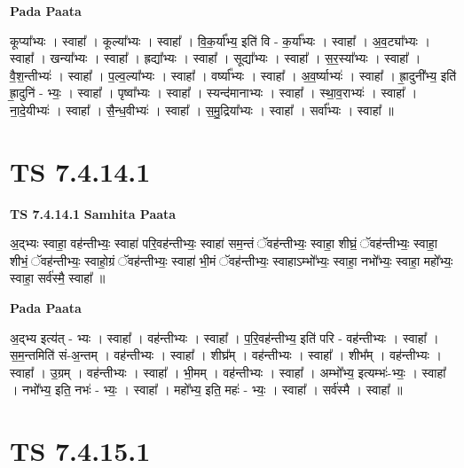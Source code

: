 \documentclass[17pt]{extarticle}
\begin{document}
\textbf{Pada Paata} \newline

कूप्या᳚भ्यः । स्वाहा᳚ । कूल्या᳚भ्यः । स्वाहा᳚ । वि॒क॒र्या᳚भ्य॒ इति॑ वि - क॒र्या᳚भ्यः । स्वाहा᳚ । अ॒व॒ट्या᳚भ्यः । स्वाहा᳚ । खन्या᳚भ्यः । स्वाहा᳚ । ह्रद्या᳚भ्यः । स्वाहा᳚ । सूद्या᳚भ्यः । स्वाहा᳚ । स॒र॒स्या᳚भ्यः । स्वाहा᳚ । वै॒श॒न्तीभ्यः॑ । स्वाहा᳚ । प॒ल्व॒ल्या᳚भ्यः । स्वाहा᳚ । वर्ष्या᳚भ्यः । स्वाहा᳚ । अ॒व॒र्ष्याभ्यः॑ । स्वाहा᳚ । ह्रा॒दुनी᳚भ्य॒ इति॑ ह्रा॒दुनि॑ - भ्यः॒ । स्वाहा᳚ । पृष्वा᳚भ्यः । स्वाहा᳚ । स्यन्द॑मानाभ्यः । स्वाहा᳚ । स्था॒व॒राभ्यः॑ । स्वाहा᳚ । ना॒दे॒यीभ्यः॑ । स्वाहा᳚ । सै॒न्ध॒वीभ्यः॑ । स्वाहा᳚ । स॒मु॒द्रिया᳚भ्यः । स्वाहा᳚ । सर्वा᳚भ्यः । स्वाहा᳚ ॥  \newline





\section{ TS 7.4.14.1 }

\textbf{TS 7.4.14.1 } \newline
\textbf{Samhita Paata} \newline

अ॒द्भ्यः स्वाहा॒ वह॑न्तीभ्यः॒ स्वाहा॑ परि॒वह॑न्तीभ्यः॒ स्वाहा॑ सम॒न्तं ॅवह॑न्तीभ्यः॒ स्वाहा॒ शीघ्रं॒ ॅवह॑न्तीभ्यः॒ स्वाहा॒ शीभं॒ ॅवह॑न्तीभ्यः॒ स्वाहो॒ग्रं ॅवह॑न्तीभ्यः॒ स्वाहा॑ भी॒मं ॅवह॑न्तीभ्यः॒ स्वाहाऽम्भो᳚भ्यः॒ स्वाहा॒ नभो᳚भ्यः॒ स्वाहा॒ महो᳚भ्यः॒ स्वाहा॒ सर्व॑स्मै॒ स्वाहा᳚ ॥ \newline

\textbf{Pada Paata} \newline

अ॒द्भ्य इत्य॑त् - भ्यः । स्वाहा᳚ । वह॑न्तीभ्यः । स्वाहा᳚ । प॒रि॒वह॑न्तीभ्य॒ इति॑ परि - वह॑न्तीभ्यः । स्वाहा᳚ । स॒म॒न्तमिति॑ सं-अ॒न्तम् । वह॑न्तीभ्यः । स्वाहा᳚ । शीघ्र᳚म् । वह॑न्तीभ्यः । स्वाहा᳚ । शीभ᳚म् । वह॑न्तीभ्यः । स्वाहा᳚ । उ॒ग्रम् । वह॑न्तीभ्यः । स्वाहा᳚ । भी॒मम् । वह॑न्तीभ्यः । स्वाहा᳚ । अम्भो᳚भ्य॒ इत्यम्भः॑-भ्यः॒ । स्वाहा᳚ । नभो᳚भ्य॒ इति॒ नभः॑ - भ्यः॒ । स्वाहा᳚ । महो᳚भ्य॒ इति॒ महः॑ - भ्यः॒ । स्वाहा᳚ । सर्व॑स्मै । स्वाहा᳚ ॥  \newline





\section{ TS 7.4.15.1 }
\end{document}
